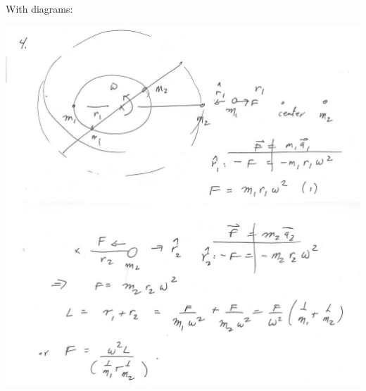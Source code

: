 \documentclass{esg8012pset}
\begin{document}
\begin{solution}
  \noindent With diagrams:
  \begin{center}\includegraphics[width=\textwidth]{ps02_Solution_Problem_2}\end{center}
\end{solution}
\end{document}
